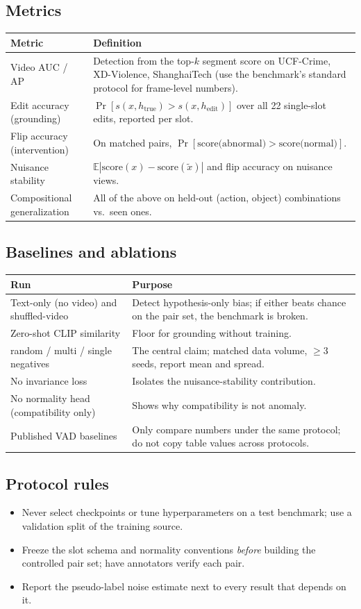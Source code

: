 \documentclass[11pt,a4paper]{article}
\begin{document}
\subsection{Metrics}
\begin{tabularx}{\linewidth}{@{}l Y@{}}
\toprule
Metric & Definition\\
\midrule
Video AUC / AP & Detection from the top-$k$ segment score on UCF-Crime, XD-Violence, ShanghaiTech (use the benchmark's standard protocol for frame-level numbers).\\
Edit accuracy (grounding) & $\Pr[s(x,h_{\text{true}})>s(x,h_{\text{edit}})]$ over all 22 single-slot edits, reported per slot.\\
Flip accuracy (intervention) & On matched pairs, $\Pr[\text{score(abnormal)}>\text{score(normal)}]$.\\
Nuisance stability & $\mathbb{E}|\text{score}(x)-\text{score}(\tilde x)|$ and flip accuracy on nuisance views.\\
Compositional generalization & All of the above on held-out (action, object) combinations vs.\ seen ones.\\
\bottomrule
\end{tabularx}

\subsection{Baselines and ablations}
\begin{tabularx}{\linewidth}{@{}l Y@{}}
\toprule
Run & Purpose\\
\midrule
Text-only (no video) and shuffled-video & Detect hypothesis-only bias; if either beats chance on the pair set, the benchmark is broken.\\
Zero-shot CLIP similarity & Floor for grounding without training.\\
random / multi / single negatives & The central claim; matched data volume, $\ge$3 seeds, report mean and spread.\\
No invariance loss & Isolates the nuisance-stability contribution.\\
No normality head (compatibility only) & Shows why compatibility is not anomaly.\\
Published VAD baselines & Only compare numbers under the same protocol; do not copy table values across protocols.\\
\bottomrule
\end{tabularx}

\subsection{Protocol rules}
\begin{itemize}
\item Never select checkpoints or tune hyperparameters on a test benchmark; use a validation split of the training source.
\item Freeze the slot schema and normality conventions \emph{before} building the controlled pair set; have annotators verify each pair.
\item Report the pseudo-label noise estimate next to every result that depends on it.
\end{itemize}
\end{document}
